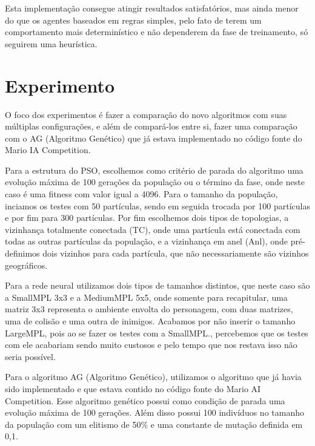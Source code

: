 \documentclass[a4paper,12pt]{article}
\begin{document}
      Esta implementação consegue atingir resultados satisfatórios, mas ainda menor do que os 
      agentes baseados em regras simples, pelo fato de terem um comportamento mais 
      determinístico e não dependerem da fase de treinamento, só seguirem uma heurística.

  
  \section{Experimento}
      
      O foco dos experimentos é fazer a comparação do novo algoritmos com suas múltiplas 
      configurações, e além de compará-los entre si, fazer uma comparação com o AG 
      (Algoritmo Genético) que já estava implementado no código fonte do Mario IA Competition.

      Para a estrutura do PSO, escolhemos como critério de parada do algoritmo uma evolução máxima 
      de 100 gerações da população ou o término da fase, onde neste caso é uma fitness com valor 
      igual a 4096. Para o tamanho da população, inciamos os testes com 50 partículas, sendo em 
      seguida trocada por 100 partículas e por fim para 300 partículas. Por fim escolhemos dois 
      tipos de topologias, a vizinhança totalmente conectada (TC), onde uma partícula está conectada 
      com todas as outras partículas da população, e a vizinhança em anel (Anl), onde pré-definimos 
      dois vizinhos para cada partícula, que não necessariamente são vizinhos geográficos.

      Para a rede neural utilizamos dois tipos de tamanhos distintos, que neste caso são a SmallMPL 
      3x3 e a MediumMPL 5x5, onde somente para recapitular, uma matriz 3x3 representa o ambiente 
      envolta do personagem, com duas matrizes, uma de colisão e uma outra de inimigos. Acabamos 
      por não inserir o tamanho LargeMPL, pois ao se fazer os testes com a SmallMPL., percebemos 
      que os testes com ele acabariam sendo muito custosos e pelo tempo que nos restava isso não 
      seria possível.

      Para o algoritmo AG (Algoritmo Genético), utilizamos o algoritmo que já havia sido 
      implementado e que estava contido no código fonte do Mario AI Competition. Esse algoritmo 
      genético possui como condição de parada uma evolução máxima de 100 gerações. Além disso 
      possui 100 indivíduos no tamanho da população com um elitismo de 50\% e uma constante de 
      mutação definida em 0,1.
      
\end{document}
